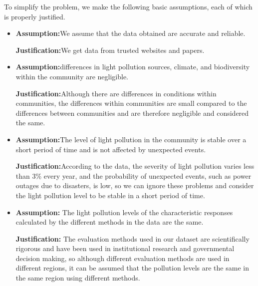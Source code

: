 \documentclass[12pt]{article}
\begin{document}
To simplify the problem, we make the following basic assumptions, each of which 
is properly justified.
\begin{itemize}
    \item \textbf{Assumption:}We assume that the data obtained are accurate and reliable.

    \textbf{Justification:}We get data from trusted websites and papers.
    \item \textbf{Assumption:}differences in light pollution sources, climate, and biodiversity within the community are negligible.

    \textbf{Justification:}Although there are differences in conditions within communities, the differences within communities are small compared to the differences between communities and are therefore negligible and considered the same.
    \item \textbf{Assumption:}The level of light pollution in the community is stable over a short period of time and is not affected by unexpected events.

    \textbf{Justification:}According to the data, the severity of light pollution varies less than 3\% every year, and the probability of unexpected events, such as power outages due to disasters, is low, so we can ignore these problems and consider the light pollution level to be stable in a short period of time.
    \item\textbf{Assumption:}
The light pollution levels of the characteristic responses calculated by the different methods in the data are the same.

    \textbf{Justification:}
    The evaluation methods used in our dataset are scientifically rigorous and have been used in institutional research and governmental decision making, so although different evaluation methods are used in different regions, it can be assumed that the pollution levels are the same in the same region using different methods.
\end{itemize}




\end{document}
